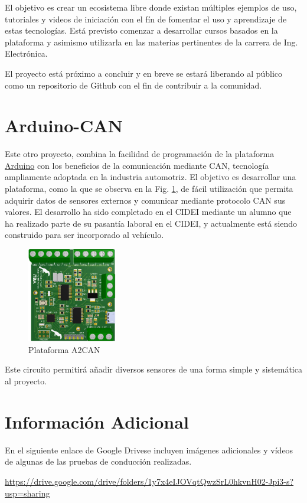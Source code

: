 \documentclass[a4paper]{article}
\begin{document}
El objetivo es crear un ecosistema libre donde existan múltiples ejemplos de uso, tutoriales y videos de iniciación con el fín de fomentar el uso y aprendizaje de estas tecnologías. Está previsto comenzar a desarrollar cursos basados en la plataforma y asimismo utilizarla en las materias pertinentes de la carrera de Ing. Electrónica.

El proyecto está próximo a concluir y en breve se estará liberando al público como un repositorio de Github con el fin de contribuir a la comunidad.

\section{Arduino-CAN}
Este otro proyecto, combina la facilidad de programación de la plataforma \href{http://arduino.cc}{Arduino} con los beneficios de la comunicación mediante CAN, tecnología ampliamente adoptada en la industria automotriz. El objetivo es desarrollar una plataforma, como la que se observa en la Fig. \ref{fig:a2can}, de fácil utilización que permita adquirir datos de sensores externos y comunicar mediante protocolo CAN sus valores. El desarrollo ha sido completado en el CIDEI mediante un alumno que ha realizado parte de su pasantía laboral en el CIDEI, y actualmente está siendo construido para ser incorporado al vehículo.
%
\begin{figure}[h]
    \centering
    \includegraphics[width=0.35\textwidth]{figs/a2can.png}
    \caption{Plataforma A2CAN}
    \label{fig:a2can}
\end{figure}

Este circuito permitirá añadir diversos sensores de una forma simple y sistemática al proyecto.

\section{Información Adicional}
En el siguiente enlace de Google Drive\texttrademark \space se incluyen imágenes adicionales y vídeos de algunas de las pruebas de conducción realizadas. 

\href{https://drive.google.com/drive/folders/1y7x4eIJOVqtQwzSrL0hkvnH02-Jpi3-s?usp=sharing}{https://drive.google.com/drive/folders/1y7x4eIJOVqtQwzSrL0hkvnH02-Jpi3-s?usp=sharing}
\end{document}

